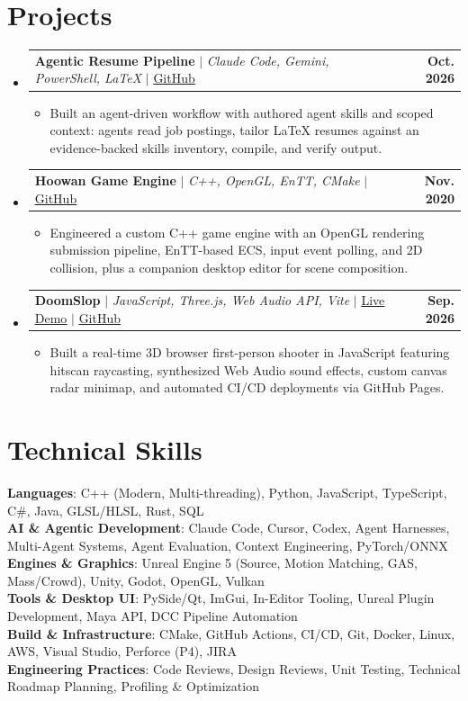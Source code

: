 \documentclass[letterpaper,11pt]{article}
\makeatletter
\newcommand{\resumeItem}[1]{
  \item\small{
    {#1 \vspace{-2pt}}
  }
}
\newcommand{\resumeProjectHeading}[2]{
    \item
    \begin{tabular*}{1.0\textwidth}{l@{\extracolsep{\fill}}r}
      \small#1 & \textbf{\small #2}\\
    \end{tabular*}\vspace{-7pt}
}
\newcommand{\resumeSubHeadingListStart}{\begin{itemize}[leftmargin=0.0in, label={}]}
\newcommand{\resumeSubHeadingListEnd}{\end{itemize}}
\newcommand{\resumeItemListStart}{\begin{itemize}}
\newcommand{\resumeItemListEnd}{\end{itemize}\vspace{-5pt}}
\makeatother
\begin{document}
\section{Projects}
    \resumeSubHeadingListStart
      \resumeProjectHeading
          {\textbf{Agentic Resume Pipeline} $|$ \emph{Claude Code, Gemini, PowerShell, LaTeX} $|$ \href{https://github.com/hoowan-dev/resume}{\underline{GitHub}}}{Oct. 2026}
          \resumeItemListStart
            \resumeItem{Built an agent-driven workflow with authored agent skills and scoped context: agents read job postings, tailor LaTeX resumes against an evidence-backed skills inventory, compile, and verify output.}
          \resumeItemListEnd
      \resumeProjectHeading
          {\textbf{Hoowan Game Engine} $|$ \emph{C++, OpenGL, EnTT, CMake} $|$ \href{https://github.com/juanbecerra0/Hoowan}{\underline{GitHub}}}{Nov. 2020}
          \resumeItemListStart
            \resumeItem{Engineered a custom C++ game engine with an OpenGL rendering submission pipeline, EnTT-based ECS, input event polling, and 2D collision, plus a companion desktop editor for scene composition.}
          \resumeItemListEnd
      \resumeProjectHeading
          {\textbf{DoomSlop} $|$ \emph{JavaScript, Three.js, Web Audio API, Vite} $|$ \href{https://hoowan-dev.github.io/DoomSlop/}{\underline{Live Demo}} $|$ \href{https://github.com/hoowan-dev/DoomSlop}{\underline{GitHub}}}{Sep. 2026}
          \resumeItemListStart
            \resumeItem{Built a real-time 3D browser first-person shooter in JavaScript featuring hitscan raycasting, synthesized Web Audio sound effects, custom canvas radar minimap, and automated CI/CD deployments via GitHub Pages.}
          \resumeItemListEnd
    \resumeSubHeadingListEnd
\vspace{-10pt}

\section{Technical Skills}
 \begin{itemize}[leftmargin=0.15in, label={}]
    \small{\item{
     \textbf{Languages}{: C++ (Modern, Multi-threading), Python, JavaScript, TypeScript, C\#, Java, GLSL/HLSL, Rust, SQL} \\
     \textbf{AI \& Agentic Development}{: Claude Code, Cursor, Codex, Agent Harnesses, Multi-Agent Systems, Agent Evaluation, Context Engineering, PyTorch/ONNX} \\
     \textbf{Engines \& Graphics}{: Unreal Engine 5 (Source, Motion Matching, GAS, Mass/Crowd), Unity, Godot, OpenGL, Vulkan} \\
     \textbf{Tools \& Desktop UI}{: PySide/Qt, ImGui, In-Editor Tooling, Unreal Plugin Development, Maya API, DCC Pipeline Automation} \\
     \textbf{Build \& Infrastructure}{: CMake, GitHub Actions, CI/CD, Git, Docker, Linux, AWS, Visual Studio, Perforce (P4), JIRA} \\
     \textbf{Engineering Practices}{: Code Reviews, Design Reviews, Unit Testing, Technical Roadmap Planning, Profiling \& Optimization}
    }}
 \end{itemize}
 \vspace{-12pt}
\end{document}
